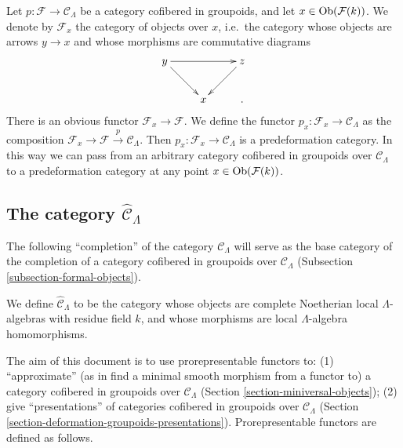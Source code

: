 \begin{remark}
\label{remark-localize-cofibered-groupoid} 
Let $p: \mathcal F \rightarrow \mathcal C_{\Lambda}$ be a category cofibered in 
groupoids, and let $x \in \textnormal{Ob}(\mathcal F(k))$.  We denote by 
$\mathcal F_{x}$ the category of objects over $x$, i.e.\ the category whose 
objects are arrows $y \rightarrow x$ and whose morphisms are commutative 
diagrams
\[
\xymatrix{
y \ar[rr] \ar[dr] &   & z \ar[dl] \\
                 & x &. 
}
\]
There is an obvious functor $\mathcal F_{x} \rightarrow \mathcal F$.  We define 
the functor $p_x: \mathcal F_{x} \rightarrow \mathcal C_{\Lambda}$ as the 
composition $\mathcal F_x \rightarrow \mathcal F \xrightarrow{p} \mathcal 
C_{\Lambda}$. Then $p_x : \mathcal F_x \rightarrow \mathcal C_{\Lambda}$ is a 
predeformation category.  In this way we can pass from an arbitrary category 
cofibered in groupoids over $\mathcal C_{\Lambda}$ to a predeformation category 
at any point $x \in \textnormal{Ob}(\mathcal F(k))$.
\end{remark}

\subsection{The category $\widehat{\mathcal C}_{\Lambda}$}
\label{subsection-category-completion-CLambda}

\noindent
The following ``completion'' of the category $\mathcal C_{\Lambda}$ will serve 
as the base category of the completion of a category cofibered in groupoids 
over $\mathcal C_{\Lambda}$
(Subsection \ref{subsection-formal-objects}).

\begin{definition}
\label{definition-completion-CLambda}
We define {\it $\widehat{\mathcal C}_{\Lambda}$}
to be the category whose objects are 
complete Noetherian local $\Lambda$-algebras with residue field $k$, and whose 
morphisms are local $\Lambda$-algebra homomorphisms.
\end{definition}

\noindent
The aim of this document is to use prorepresentable functors to: (1) 
``approximate'' (as in find a minimal smooth morphism from a functor to) a 
category cofibered in groupoids over $\mathcal C_{\Lambda}$ (Section 
\ref{section-miniversal-objects}); (2) give ``presentations'' of categories 
cofibered in groupoids over $\mathcal C_{\Lambda}$ (Section 
\ref{section-deformation-groupoids-presentations}).  Prorepresentable functors 
are defined as follows.

